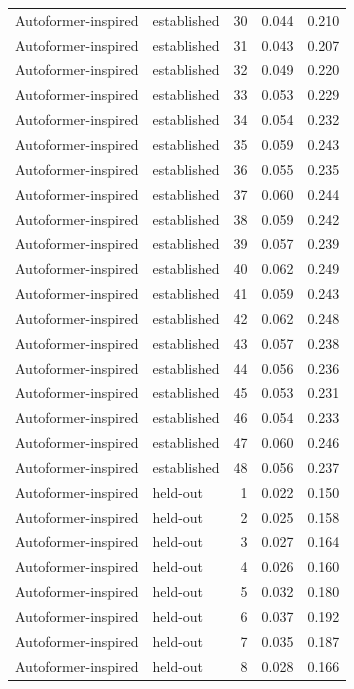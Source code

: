 \begin{tabular}{llrrr}
Autoformer-inspired & established & 30 & 0.044 & 0.210 \\
Autoformer-inspired & established & 31 & 0.043 & 0.207 \\
Autoformer-inspired & established & 32 & 0.049 & 0.220 \\
Autoformer-inspired & established & 33 & 0.053 & 0.229 \\
Autoformer-inspired & established & 34 & 0.054 & 0.232 \\
Autoformer-inspired & established & 35 & 0.059 & 0.243 \\
Autoformer-inspired & established & 36 & 0.055 & 0.235 \\
Autoformer-inspired & established & 37 & 0.060 & 0.244 \\
Autoformer-inspired & established & 38 & 0.059 & 0.242 \\
Autoformer-inspired & established & 39 & 0.057 & 0.239 \\
Autoformer-inspired & established & 40 & 0.062 & 0.249 \\
Autoformer-inspired & established & 41 & 0.059 & 0.243 \\
Autoformer-inspired & established & 42 & 0.062 & 0.248 \\
Autoformer-inspired & established & 43 & 0.057 & 0.238 \\
Autoformer-inspired & established & 44 & 0.056 & 0.236 \\
Autoformer-inspired & established & 45 & 0.053 & 0.231 \\
Autoformer-inspired & established & 46 & 0.054 & 0.233 \\
Autoformer-inspired & established & 47 & 0.060 & 0.246 \\
Autoformer-inspired & established & 48 & 0.056 & 0.237 \\
Autoformer-inspired & held-out & 1 & 0.022 & 0.150 \\
Autoformer-inspired & held-out & 2 & 0.025 & 0.158 \\
Autoformer-inspired & held-out & 3 & 0.027 & 0.164 \\
Autoformer-inspired & held-out & 4 & 0.026 & 0.160 \\
Autoformer-inspired & held-out & 5 & 0.032 & 0.180 \\
Autoformer-inspired & held-out & 6 & 0.037 & 0.192 \\
Autoformer-inspired & held-out & 7 & 0.035 & 0.187 \\
Autoformer-inspired & held-out & 8 & 0.028 & 0.166 \\

\end{tabular}
